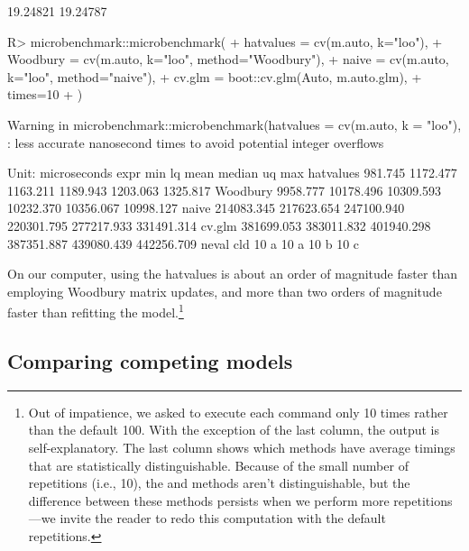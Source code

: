 \documentclass[
]{jss}
\begin{document}
\begin{CodeChunk}
\begin{CodeOutput}
[1] 19.24821 19.24787
\end{CodeOutput}
\begin{CodeInput}
R> microbenchmark::microbenchmark(
+   hatvalues = cv(m.auto, k="loo"),
+   Woodbury = cv(m.auto, k="loo", method="Woodbury"),
+   naive = cv(m.auto, k="loo", method="naive"),
+   cv.glm = boot::cv.glm(Auto, m.auto.glm),
+   times=10
+ )
\end{CodeInput}
\begin{CodeOutput}
Warning in microbenchmark::microbenchmark(hatvalues = cv(m.auto, k = "loo"), :
less accurate nanosecond times to avoid potential integer overflows
\end{CodeOutput}
\begin{CodeOutput}
Unit: microseconds
      expr        min         lq       mean     median         uq        max
 hatvalues    981.745   1172.477   1163.211   1189.943   1203.063   1325.817
  Woodbury   9958.777  10178.496  10309.593  10232.370  10356.067  10998.127
     naive 214083.345 217623.654 247100.940 220301.795 277217.933 331491.314
    cv.glm 381699.053 383011.832 401940.298 387351.887 439080.439 442256.709
 neval cld
    10 a  
    10 a  
    10  b 
    10   c
\end{CodeOutput}
\end{CodeChunk}

On our computer, using the hatvalues is about an order of magnitude
faster than employing Woodbury matrix updates, and more than two orders
of magnitude faster than refitting the model.\footnote{Out of
  impatience, we asked  to execute each command
  only 10 times rather than the default 100. With the exception of the
  last column, the output is self-explanatory. The last column shows
  which methods have average timings that are statistically
  distinguishable. Because of the small number of repetitions (i.e.,
  10), the  and  methods aren't
  distinguishable, but the difference between these methods persists
  when we perform more repetitions---we invite the reader to redo this
  computation with the default  repetitions.}

\hypertarget{comparing-competing-models}{%
\subsection{Comparing competing
models}\label{comparing-competing-models}}
\end{document}
